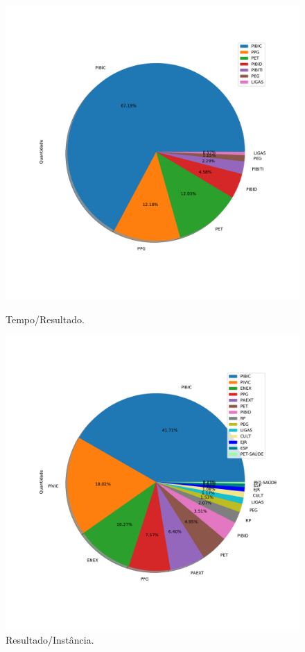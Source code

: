 \documentclass[a4paper, 12pt]{article}
\begin{document}
\begin{figure}[!htb]
    \centering
    \begin{minipage}{0.5\textwidth}
        \centering
        \includegraphics[width=1\textwidth]{../Resultados/img/programa_pie_2018.pdf}
        \caption{Tempo/Resultado.}
        \label{fig:scatter_topDown}
    \end{minipage}%
    \begin{minipage}{0.5\textwidth}
        \centering
        \includegraphics[width=1\textwidth]{../Resultados/img/programa_pie_2019.pdf}
        \caption{Resultado/Instância.}
        \label{fig:result_topDown}
    \end{minipage}
\end{figure}
\end{document}
